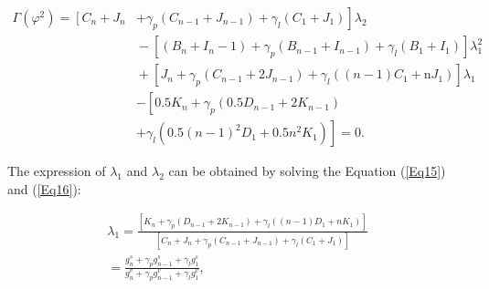 \documentclass[journal]{IEEEtran}
\begin{document}
\begin{small}
\begin{equation}
\begin{aligned}
\Gamma\left(\varphi^{2}\right)=\left[C_{n}+J_{n}\right.&\left.+\gamma_{p}\left(C_{n-1}+J_{n-1}\right)+\gamma_{l}\left(C_{1}+J_{1}\right)\right] \lambda_{2} \\
&\!-\!\left[\left(B_{n}\!+\!I_{n}-1\right)\!+\!\gamma_{p}\left(B_{n-1}\!+\!I_{n-1}\right)\!+\!\gamma_{l}\left(B_{1}\!+\!I_{1}\right)\right] \lambda_{1}^{2} \\
&\!+\!\left[J_{n}\!+\!\gamma_{p}\left(C_{n-1}\!+\!2 J_{n-1}\right)\!+\!\gamma_{l}\left((n-1) C_{1}\!+\!\mathrm{n} J_{1}\right)\right] \lambda_{1} \\
&-\left[0.5 K_{n}+\gamma_{p}\left(0.5 D_{n-1}+2 K_{n-1}\right)\right.\\
&\left.+\gamma_{l}\left(0.5(n-1)^{2} D_{1}+0.5 n^{2} K_{1}\right)\right]=0.
\end{aligned}
\label{Eq16}
\end{equation}
\end{small}

The expression of $\lambda_1$ and $\lambda_2$ can be obtained by solving the Equation (\ref{Eq15}) and (\ref{Eq16}):

\begin{equation}
\begin{gathered}
\lambda_{1}=\frac{\left[K_{n}+\gamma_{p}\left(D_{n\!-\!1}+2 K_{n\!-\!1}\right)+\gamma_{l}\left((n\!-\!1) D_{1}+n K_{1}\right)\right]}{\left[C_{n}+J_{n}+\gamma_{p}\left(C_{n\!-\!1}+J_{n\!-\!1}\right)+\gamma_{l}\left(C_{1}+J_{1}\right)\right]} \\
=\frac{g_{n}^{s}+\gamma_{p} g_{n\!-\!1}^{s}+\gamma_{l} g_{1}^{s}}{g_{n}^{v}+\gamma_{p} g_{n\!-\!1}^{v}+\gamma_{l} g_{1}^{v}},
\end{gathered}
\label{Eq17}
\end{equation}
\end{document}
